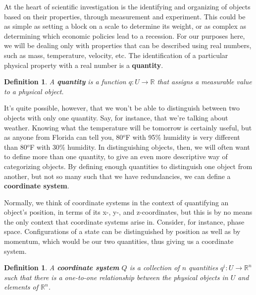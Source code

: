 \documentclass{book}
\newtheorem{defn}[equation]{Definition}
\begin{document}
At the heart of scientific investigation is the identifying and organizing of objects based on their properties, through measurement and experiment. This could be as simple as setting a block on a scale to determine its weight, or as complex as determining which economic policies lead to a recession. For our purposes here, we will be dealing only with properties that can be described using real numbers, such as mass, temperature, velocity, etc. The identification of a particular physical property with a real number is a \textbf{quantity}.

\begin{defn}
	A \textbf{quantity} is a function $q : U \to \mathbb{R}$ that assigns a measurable value to a physical object.
\end{defn}



It's quite possible, however, that we won't be able to distinguish between two objects with only one quantity. Say, for instance, that we're talking about weather. Knowing what the temperature will be tomorrow is certainly useful, but as anyone from Florida can tell you, 80$^o$F with 95$\%$ humidity is very different than 80$^o$F with 30$\%$ humidity. In distinguishing objects, then, we will often want to define more than one quantity, to give an even more descriptive way of categorizing objects. By defining enough quantities to distinguish one object from another, but not so many such that we have redundancies, we can define a \textbf{coordinate system}.

Normally, we think of coordinate systems in the context of quantifying an object's position, in terms of its x-, y-, and z-coordinates, but this is by no means the only context that coordinate systems arise in. Consider, for instance, phase space. Configurations of a state can be distinguished by position as well as by momentum, which would be our two quantities, thus giving us a coordinate system. 

\begin{defn}
	A \textbf{coordinate system} $Q$ is a collection of $n$ quantities $q^i : U \to \mathbb{R}^n$ such that there is a one-to-one relationship between the physical objects in $U$ and elements of $\mathbb{R}^n$.
\end{defn}
\end{document}
